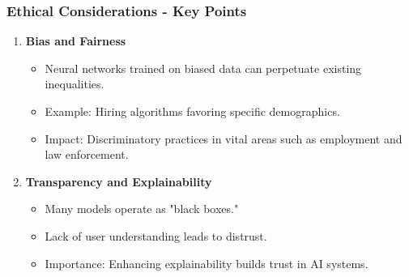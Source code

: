 \documentclass[aspectratio=169]{beamer}
\begin{document}
\begin{frame}[fragile]
    \frametitle{Ethical Considerations - Key Points}
    \begin{enumerate}
        \item \textbf{Bias and Fairness}
            \begin{itemize}
                \item Neural networks trained on biased data can perpetuate existing inequalities.
                \item Example: Hiring algorithms favoring specific demographics.
                \item Impact: Discriminatory practices in vital areas such as employment and law enforcement.
            \end{itemize}
        \item \textbf{Transparency and Explainability}
            \begin{itemize}
                \item Many models operate as "black boxes."
                \item Lack of user understanding leads to distrust.
                \item Importance: Enhancing explainability builds trust in AI systems.
            \end{itemize}
    \end{enumerate}
\end{frame}
\end{document}
